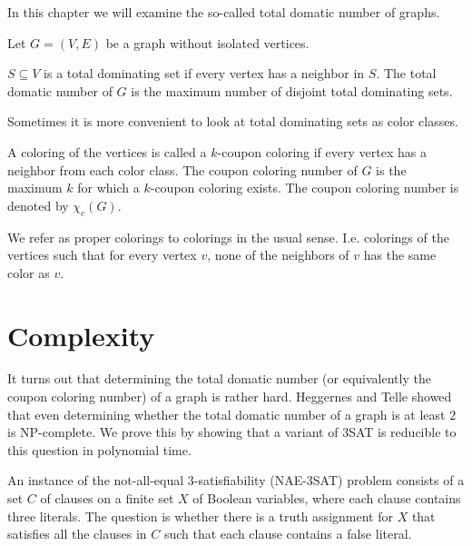 In this chapter we will examine the so-called total domatic number of graphs.

Let $G = (V, E)$ be a graph without isolated vertices.

\begin{definition}
  $S \subseteq V$ is a total dominating set if every vertex has a neighbor in
  $S$. The total domatic number of $G$ is the maximum number of disjoint total
  dominating sets.
\end{definition}

Sometimes it is more convenient to look at total dominating sets as color classes.

\begin{definition}
  A coloring of the vertices is called a $k$-coupon coloring if every vertex
  has a neighbor from each color class. The coupon coloring number of $G$ is
  the maximum $k$ for which a $k$-coupon coloring exists. The coupon coloring
  number is denoted by $\chi_c(G)$.
\end{definition}

\begin{remark}
  We refer as proper colorings to colorings in the usual sense. I.e. colorings of
  the vertices such that for every vertex $v$, none of the neighbors of $v$ has the
  same color as $v$.
\end{remark}

\section{Complexity}

It turns out that determining the total domatic number (or equivalently the
coupon coloring number) of a graph is rather hard. Heggernes and Telle \cite{np-complete}
showed that even determining whether the total
domatic number of a graph is at least $2$ is NP-complete. We prove this by showing
that a variant of 3SAT is reducible to this question in polynomial time.

\begin{definition}
  An instance of the not-all-equal 3-satisfiability (NAE-3SAT) problem consists of
  a set $C$ of clauses on a finite set $X$ of Boolean variables, where each clause
  contains three literals. The question is whether there is a truth assignment for
  $X$ that satisfies all the clauses in $C$ such that each clause contains a false
  literal.
\end{definition}

